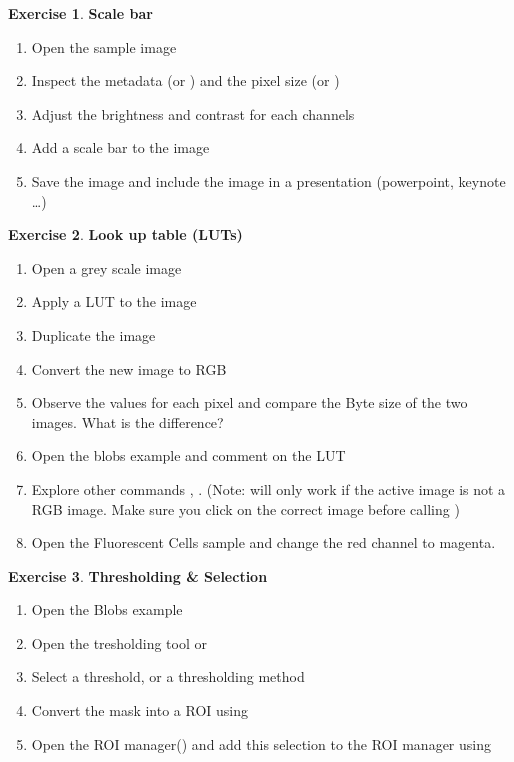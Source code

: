 \documentclass[xcolor=table,DIV=19,twocolumn]{scrartcl}
\theoremstyle{definition}
\newtheorem{exercice}{Exercise}
\begin{document}
\begin{exercice} \textbf{Scale bar}
  \begin{enumerate}
  \item Open the sample image 
  \item Inspect the metadata  (or ) and the pixel size  (or )
  \item Adjust the brightness and contrast for each channels
  \item Add a scale bar to the image
  \item Save the image and include the image in a presentation (powerpoint, keynote \dots)
  \end{enumerate}
\end{exercice}


\begin{exercice} \textbf{Look up table (LUTs)}
  \begin{enumerate}
  \item Open a grey scale image 
  \item Apply a LUT to the image 
  \item Duplicate the image 
  \item Convert the new image to RGB 
  \item Observe the values for each pixel and compare the Byte size of the two images. What is the difference?
  \item Open the blobs example  and
    comment on the LUT
  \item Explore other commands ,
    . (Note:  will only work if the active image  is not a RGB image. Make sure you click on the correct image before calling )
  \item Open the Fluorescent Cells sample and change the red channel
    to magenta.
  \end{enumerate}
\end{exercice}

\begin{exercice} \textbf{Thresholding \& Selection}
  \begin{enumerate}
  \item Open the Blobs example 
  \item Open the tresholding tool  or 
  \item Select a threshold, or a thresholding method
  \item Convert the mask into a ROI using 
  \item Open the ROI manager() and add this selection to the ROI manager using 
  \end{enumerate}
\end{exercice}
\end{document}
